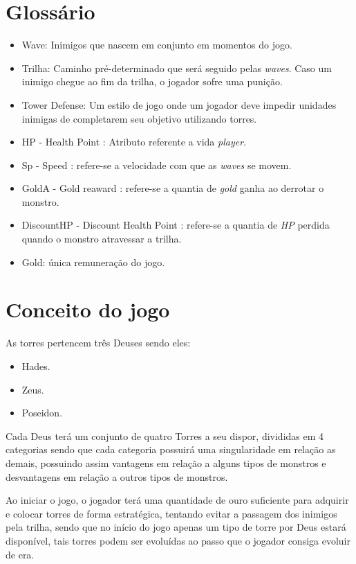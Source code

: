 \documentclass[11pt]{article} %
\begin{document}
\section{Glossário}
\begin{itemize}
\item Wave: Inimigos que nascem em conjunto em momentos do jogo.
\item Trilha: Caminho pré-determinado que será seguido pelas \textit{waves}. Caso um inimigo chegue ao fim da trilha, o jogador sofre uma punição.
\item Tower Defense: Um estilo de jogo onde um jogador deve impedir unidades inimigas de completarem seu objetivo utilizando torres.
\item HP - Health Point : Atributo referente a vida \textit{player}.
\item Sp - Speed : refere-se a velocidade com que as \textit{waves} se movem.
\item GoldA - Gold reaward  : refere-se a quantia de \textit{gold} ganha ao derrotar o monstro.
\item DiscountHP - Discount Health Point : refere-se a quantia de \textit{HP} perdida quando o monstro atravessar a trilha.
\item Gold: única remuneração do jogo.
\end{itemize} 
 
\section{Conceito do jogo}

As torres pertencem  três Deuses sendo eles:
\begin{itemize}
\item Hades.
\item Zeus.
\item Poseidon.
\end{itemize}

Cada Deus terá um conjunto de quatro Torres a seu dispor, divididas em 4 categorias sendo que cada categoria possuirá uma singularidade em relação as demais, possuindo assim vantagens em relação a alguns tipos de monstros e desvantagens em relação a outros tipos de monstros.

Ao iniciar o jogo, o jogador terá uma quantidade de ouro suficiente para adquirir e colocar torres de forma estratégica, tentando evitar a passagem dos inimigos pela trilha, sendo que no início do jogo apenas um tipo de torre por Deus estará disponível, tais torres podem ser evoluídas ao passo que o jogador consiga evoluir de era. 
\end{document}
